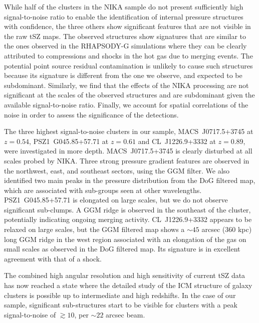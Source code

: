 \documentclass[twocolumn,traditabstract]{aa}
\begin{document}
While half of the clusters in the NIKA sample do not present sufficiently high signal-to-noise ratio to enable the identification of internal pressure structures with confidence, the three others show significant features that are not visible in the raw tSZ maps. The observed structures show signatures that are similar to the ones observed in the RHAPSODY-G simulations where they can be clearly attributed to compressions and shocks in the hot gas due to merging events. The potential point source residual contamination is unlikely to cause such structures because its signature is different from the one we observe, and expected to be subdominant. Similarly, we find that the effects of the NIKA processing are not significant at the scales of the observed structures and are subdominant given the available signal-to-noise ratio. Finally, we account for spatial correlations of the noise in order to assess the significance of the detections.

The three highest signal-to-noise clusters in our sample, \mbox{MACS~J0717.5+3745} at $z=0.54$, \mbox{PSZ1~G045.85+57.71} at $z=0.61$ and \mbox{CL~J1226.9+3332} at $z=0.89$, were investigated in more depth. \mbox{MACS~J0717.5+3745} is clearly disturbed at all scales probed by NIKA. Three strong pressure gradient features are observed in the northwest, east, and southeast sectors, using the GGM filter. We also identified two main peaks in the pressure distribution from the DoG filtered map, which are associated with sub-groups seen at other wavelengths. \mbox{PSZ1~G045.85+57.71} is elongated on large scales, but we do not observe significant sub-clumps. A GGM ridge is observed in the southeast of the cluster, potentially indicating ongoing merging activity. \mbox{CL~J1226.9+3332} appears to be relaxed on large scales, but the GGM filtered map shows a $\sim 45$ arcsec (360 kpc) long GGM ridge in the west region associated with an elongation of the gas on small scales as observed in the DoG filtered map. Its signature is in excellent agreement with that of a shock.

The combined high angular resolution and high sensitivity of current tSZ data has now reached a state where the detailed study of the ICM structure of galaxy clusters is possible up to intermediate and high redshifts. In the case of our sample, significant sub-structures start to be visible for clusters with a peak signal-to-noise of $\gtrsim 10$, per $\sim 22$ arcsec beam.
\end{document}
